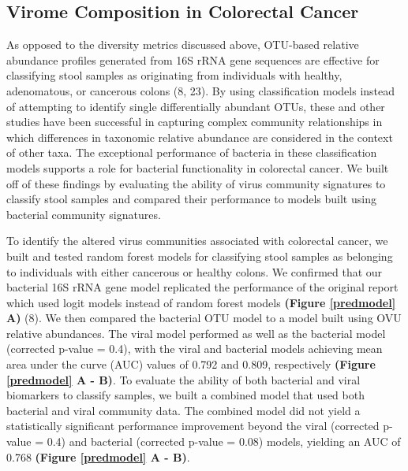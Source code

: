 \documentclass[12pt,]{article}
\begin{document}
\subsection{Virome Composition in Colorectal
Cancer}\label{virome-composition-in-colorectal-cancer}

As opposed to the diversity metrics discussed above, OTU-based relative
abundance profiles generated from 16S rRNA gene sequences are effective
for classifying stool samples as originating from individuals with
healthy, adenomatous, or cancerous colons (8, 23). By using
classification models instead of attempting to identify single
differentially abundant OTUs, these and other studies have been
successful in capturing complex community relationships in which
differences in taxonomic relative abundance are considered in the
context of other taxa. The exceptional performance of bacteria in these
classification models supports a role for bacterial functionality in
colorectal cancer. We built off of these findings by evaluating the
ability of virus community signatures to classify stool samples and
compared their performance to models built using bacterial community
signatures.

To identify the altered virus communities associated with colorectal
cancer, we built and tested random forest models for classifying stool
samples as belonging to individuals with either cancerous or healthy
colons. We confirmed that our bacterial 16S rRNA gene model replicated
the performance of the original report which used logit models instead
of random forest models \textbf{(Figure \ref{predmodel} A)} (8). We then
compared the bacterial OTU model to a model built using OVU relative
abundances. The viral model performed as well as the bacterial model
(corrected p-value = 0.4), with the viral and bacterial models achieving
mean area under the curve (AUC) values of 0.792 and 0.809, respectively
\textbf{(Figure \ref{predmodel} A - B)}. To evaluate the ability of both
bacterial and viral biomarkers to classify samples, we built a combined
model that used both bacterial and viral community data. The combined
model did not yield a statistically significant performance improvement
beyond the viral (corrected p-value = 0.4) and bacterial (corrected
p-value = 0.08) models, yielding an AUC of 0.768 \textbf{(Figure
\ref{predmodel} A - B)}.
\end{document}
